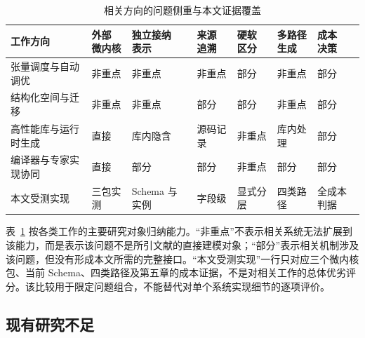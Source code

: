 \begin{table}[!htbp]
  \centering
  \caption{相关方向的问题侧重与本文证据覆盖}
  \label{tab:chapter1-related-work-comparison}
  \begingroup
  \begin{tabularx}{\textwidth}{
    @{}
    >{\raggedright\arraybackslash}p{}
    *{6}{>{\centering\arraybackslash}X}
    @{}
  }
    \toprule
    \textbf{工作方向} &
    \makecell[c]{\textbf{外部}\\\textbf{微内核}} &
    \makecell[c]{\textbf{独立接纳}\\\textbf{表示}} &
    \makecell[c]{\textbf{来源}\\\textbf{追溯}} &
    \makecell[c]{\textbf{硬软}\\\textbf{区分}} &
    \makecell[c]{\textbf{多路径}\\\textbf{生成}} &
    \makecell[c]{\textbf{成本}\\\textbf{决策}} \\
    \midrule
    张量调度与自动调优\cite{Zheng2020Ansor,Shao2022TensorProgram,Hellsten2023BaCO}
      & 非重点 & 非重点 & 非重点 & 部分 & 非重点 & 部分 \\
    结构化空间与迁移\cite{Zhu2022ROLLER,Tollenaere2023AutotuningConvolutions,Gibson2022TransferTuning}
      & 非重点 & 非重点 & 部分 & 部分 & 非重点 & 部分 \\
    高性能库与运行时生成\cite{VanZee2015BLIS,OpenMathLibOpenBLAS,Heinecke2016LIBXSMM}
      & 直接 & 库内隐含 & 源码记录 & 非重点 & 库内处理 & 部分 \\
    编译器与专家实现协同\cite{Georganas2021TPP,Tavarageri2021PolyDL,Li2024OneDNNGraphCompiler,Xing2022Bolt}
      & 直接 & 部分 & 部分 & 非重点 & 部分 & 部分 \\
    本文受测实现
      & 三包实测 & Schema 与实例 & 字段级 & 显式分层 & 四类路径 & 全成本判据 \\
    \bottomrule
  \end{tabularx}
  \endgroup
\end{table}

表~\ref{tab:chapter1-related-work-comparison} 按各类工作的主要研究对象归纳能力。“非重点”不表示相关系统无法扩展到该能力，而是表示该问题不是所引文献的直接建模对象；“部分”表示相关机制涉及该问题，但没有形成本文所需的完整接口。“本文受测实现”一行只对应三个微内核包、当前 Schema、四类路径及第五章的成本证据，不是对相关工作的总体优劣评分。该比较用于限定问题组合，不能替代对单个系统实现细节的逐项评价。

\subsection{现有研究不足}

